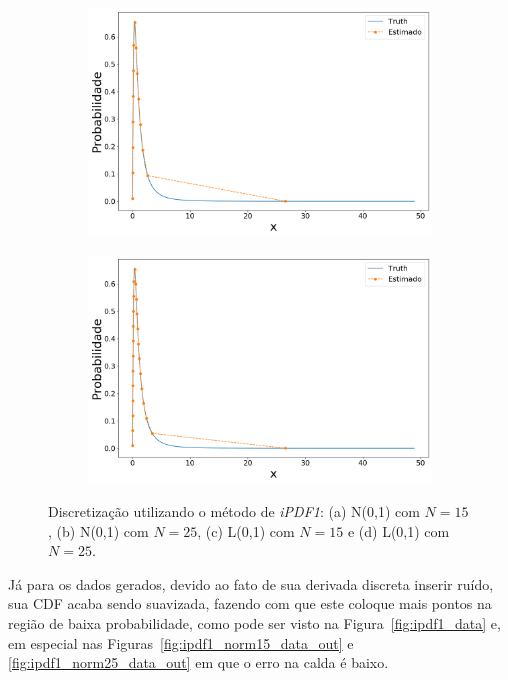 \begin{figure}[H]
	\begin{subfigure}[b]{0.45\textwidth}
		\centering 
		\includegraphics[width=\linewidth]{./figuras/iPDF1_lognormal_15_1_0_0}
		\caption{}
		\label{fig:ipdflognorm15}
	\end{subfigure}
	\hfill
	\begin{subfigure}[b]{0.45\textwidth}
		\centering 
		\includegraphics[width=\linewidth]{./figuras/iPDF1_lognormal_25_1_0_0}
		\caption{}
		\label{fig:ipdflognorm25}
	\end{subfigure}
	
	\caption{Discretização utilizando o método de \textit{iPDF1}: (a) N(0,1) com $N = 15$, (b) N(0,1) com $N = 25$, (c) L(0,1) com $N = 15$ e (d) L(0,1) com $N = 25$.}
	\label{fig:ipdfmnorm}
\end{figure}

Já para os dados gerados, devido ao fato de sua derivada discreta inserir ruído, sua CDF acaba sendo suavizada, fazendo com que este coloque mais pontos na região de baixa probabilidade, como pode ser visto na Figura~\ref{fig:ipdf1_data} e, em especial nas Figuras~\ref{fig:ipdf1_norm15_data_out} e \ref{fig:ipdf1_norm25_data_out} em que o erro na calda é baixo.

